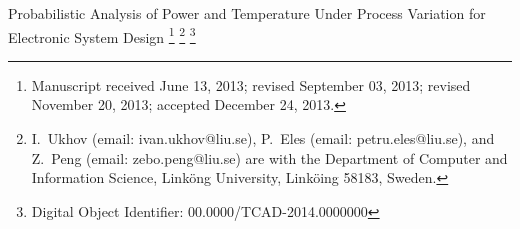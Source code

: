 {\TitleFont Probabilistic Analysis of Power and Temperature Under Process Variation for Electronic System Design}%
\thanks{Manuscript received June 13, 2013; revised September 03, 2013; revised November 20, 2013; accepted December 24, 2013.}
\thanks{I.~Ukhov (email: ivan.ukhov@liu.se), P.~Eles (email: petru.eles@liu.se), and Z.~Peng (email: zebo.peng@liu.se) are with the Department of Computer and Information Science, Link\"{o}ng University, Link\"{o}ing 58183, Sweden.}
\thanks{Digital Object Identifier: 00.0000/TCAD-2014.0000000}
